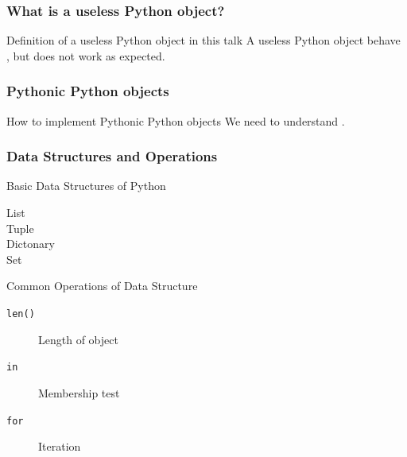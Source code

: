 \documentclass[aspectratio=169,dvipdfmx,14pt,notheorems]{beamer}
\theoremstyle{definition}
\begin{document}
\begin{frame}\frametitle{What is a useless Python object?}

\begin{block}{Definition of a useless Python object in this talk}
A useless Python object behave , but does not work as expected.
\end{block}

\end{frame}

\begin{frame}\frametitle{Pythonic Python objects}

\begin{block}{How to implement Pythonic Python objects}
We need to understand .
\end{block}

\end{frame}

\begin{frame}[fragile]\frametitle{Data Structures and Operations}

\begin{exampleblock}{Basic Data Structures of Python}
\begin{description}
\item[List] \pyv{[1, 2, 3, 4, 5]}
\item[Tuple] 
\item[Dictonary] 
\item[Set] 
\end{description}
\end{exampleblock}

\begin{exampleblock}{Common Operations of Data Structure}
\begin{description}
\item[\texttt{len()}] Length of object
\item[\texttt{in}] Membership test
\item[\texttt{for}] Iteration
\end{description}
\end{exampleblock}

\end{frame}
\end{document}
